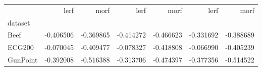 \begin{tabular}{lrrrrrr}
\toprule
{} &      lerf &      morf &      lerf &      morf &      lerf &      morf \\
dataset  &           &           &           &           &           &           \\
\midrule
Beef     & -0.406506 & -0.369865 & -0.414272 & -0.466623 & -0.331692 & -0.388689 \\
ECG200   & -0.070045 & -0.409477 & -0.078327 & -0.418808 & -0.066990 & -0.405239 \\
GunPoint & -0.392008 & -0.516388 & -0.313706 & -0.474397 & -0.377356 & -0.514522 \\
\bottomrule
\end{tabular}
